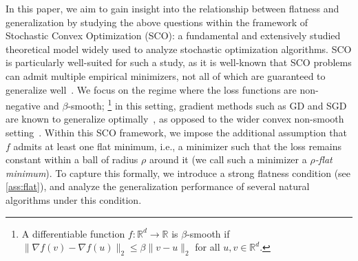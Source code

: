 \documentclass[11pt]{article}
\begin{document}
In this paper, we aim to gain insight into the relationship between flatness and generalization by studying the above questions within the framework of Stochastic Convex Optimization (SCO): a fundamental and extensively studied theoretical model widely used to analyze stochastic optimization algorithms. 
SCO is particularly well-suited for such a study, as it is well-known that SCO problems can admit multiple empirical minimizers, not all of which are guaranteed to generalize well~\citep{shalev2010learnability,feldman2016generalization}.
We focus on the regime where the loss functions are non-negative and $\beta$-smooth;%
\footnote{A differentiable function $f: \mathbb{R}^d \to \mathbb{R}$ is $\beta$-smooth if $\|\nabla f(v) - \nabla f(u)\|_{2} \leq \beta \|v - u\|_2$ for all $u, v \in \mathbb{R}^d$.} 
in this setting, gradient methods such as GD and SGD are known to generalize optimally~\citep{hardt2016train,nikolakakis2022beyond}, as opposed to the wider convex non-smooth setting~\citep{amir2021sgd, schliserman2024dimension,livni2024sample,vansover2025rapid}.  
Within this SCO framework, we impose the additional assumption that $f$ admits at least one flat minimum, i.e., a minimizer such that the loss remains constant within a ball of radius $\rho$ around it (we call such a minimizer a \emph{$\rho$-flat minimum}). %
To capture this formally, we introduce a strong flatness condition (see \cref{ass:flat}), and analyze the generalization performance of several natural algorithms under this condition. 
\end{document}
